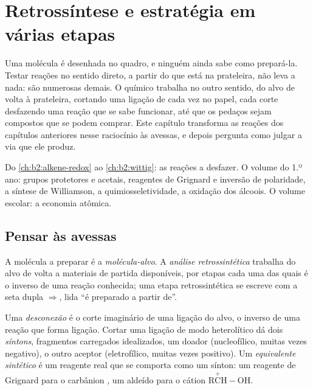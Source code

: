 \chapter{Retrossíntese e estratégia em várias etapas}\label{ch:b2:retrosynthesis}

Uma molécula é desenhada no quadro, e ninguém ainda sabe como prepará-la. Testar reações no sentido
direto, a partir do que está na prateleira, não leva a nada: são numerosas demais. O químico trabalha
no outro sentido, do alvo de volta à prateleira, cortando uma ligação de cada vez no papel, cada corte
desfazendo uma reação que se sabe funcionar, até que os pedaços sejam compostos que se podem comprar.
Este capítulo transforma as reações dos capítulos anteriores nesse raciocínio às avessas, e depois
pergunta como julgar a via que ele produz.

\begin{recall}
Do \cref{ch:b2:alkene-redox} ao \cref{ch:b2:wittig}: as reações a desfazer. O volume do 1.º ano: grupos
protetores e acetais, reagentes de Grignard e inversão de polaridade, a síntese de Williamson, a
quimiosseletividade, a oxidação dos álcoois. O volume escolar: a economia atômica.
\end{recall}

\section{Pensar às avessas}

\begin{definition}\label{def:b2:retrosynthesis:analysis}
A molécula a preparar é a \emph{molécula-alvo}. A \emph{análise retrossintética}
 trabalha do alvo de volta a materiais de partida disponíveis,
por etapas cada uma das quais é o inverso de uma reação conhecida; uma etapa retrossintética se escreve
com a seta dupla $\Rightarrow$, lida ``é preparado a partir de''.
\end{definition}

\begin{definition}\label{def:b2:retrosynthesis:disconnection}
Uma \emph{desconexão} é o corte imaginário de uma ligação do alvo, o
inverso de uma reação que forma ligação. Cortar uma ligação de modo heterolítico dá dois \emph{síntons},
fragmentos carregados idealizados, um doador (nucleofílico, muitas vezes negativo), o outro aceptor
(eletrofílico, muitas vezes positivo). Um \emph{equivalente sintético} é um reagente
real que se comporta como um sínton: um reagente de Grignard para o carbânion , um aldeído para o
cátion $\mathrm{R\overset{+}{C}H{-}OH}$.
\end{definition}

